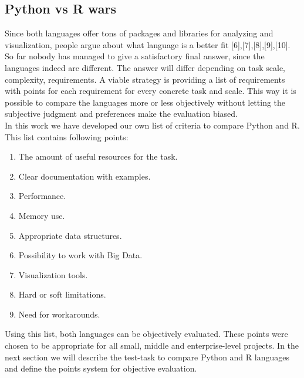 \documentclass[
  twoside,
  12pt, a4paper,
  footinclude=true,
  headinclude=true,
  cleardoublepage=empty
]{article}
\begin{document}
\subsection{Python vs R wars}
Since both languages offer tons of packages and libraries for analyzing and visualization, people argue about what language is a better fit [6],[7],[8],[9],[10].
So far nobody has managed to give a satisfactory final answer, since the languages indeed are different. The answer will differ depending on task scale, complexity, requirements. A viable strategy is providing a list of requirements with points for each requirement for every concrete task and scale. This way it is possible to compare the languages more or less objectively without letting the subjective judgment and preferences make the evaluation biased.\\
In this work we have developed our own list of criteria to compare Python and R. This list contains following points:
\begin{enumerate}
    \item The amount of useful resources for the task.
    \item Clear documentation with examples.
    \item Performance.
    \item Memory use.
    \item Appropriate data structures.
    \item Possibility to work with Big Data.
    \item Visualization tools.
    \item Hard or soft limitations.
    \item Need for workarounds.
\end{enumerate}
Using this list, both languages can be objectively evaluated. These points were chosen to be appropriate for all small, middle and enterprise-level projects. In the next section we will describe the test-task to compare Python and R languages and define the points system for objective evaluation.\\
\end{document}
